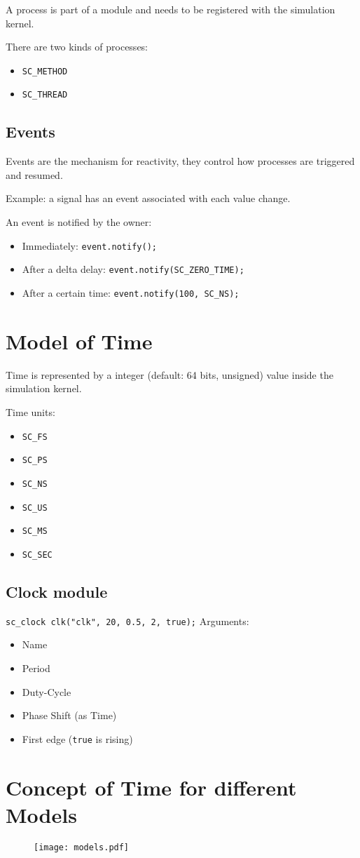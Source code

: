 A process is part of a module and needs to be registered with the simulation kernel.

There are two kinds of processes:
\begin{itemize}
    \item \lstinline{SC_METHOD}
    \item \lstinline{SC_THREAD}
\end{itemize}

\subsection{Events}
Events are the mechanism for reactivity, they control how processes are triggered and resumed.

Example: a signal has an event associated with each value change.

An event is notified by the owner:
\begin{itemize}
    \item Immediately: \lstinline{event.notify();}
    \item After a delta delay: \lstinline{event.notify(SC_ZERO_TIME);}
    \item After a certain time: \lstinline{event.notify(100, SC_NS);}
\end{itemize}

\section{Model of Time}
Time is represented by a integer (default: 64 bits, unsigned) value inside the simulation kernel.

Time units:
\begin{itemize}
    \item \lstinline{SC_FS}
    \item \lstinline{SC_PS}
    \item \lstinline{SC_NS}
    \item \lstinline{SC_US}
    \item \lstinline{SC_MS}
    \item \lstinline{SC_SEC}
\end{itemize}

\subsection{Clock module}
\lstinline{sc_clock clk("clk", 20, 0.5, 2, true);}
Arguments:
\begin{itemize}
    \item Name
    \item Period
    \item Duty-Cycle
    \item Phase Shift (as Time)
    \item First edge (\lstinline{true} is rising)
\end{itemize}

\section{Concept of Time for different Models}
\begin{figure}[H]
    \centering
    \texttt{[image: models.pdf]}
\end{figure}

